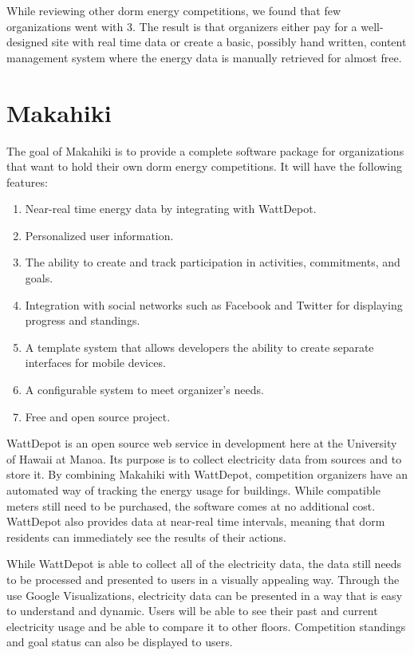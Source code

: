 While reviewing other dorm energy competitions, we found that few organizations went with 3.  The result is that organizers either pay for a well-designed site with real time data or create a basic, possibly hand written, content management system where the energy data is manually retrieved for almost free.

\section{Makahiki}

The goal of Makahiki is to provide a complete software package for organizations that want to hold their own dorm energy competitions.  It will have the following features:

\begin{enumerate}
	\item Near-real time energy data by integrating with WattDepot.
	\item Personalized user information.
	\item The ability to create and track participation in activities, commitments, and goals.
	\item Integration with social networks such as Facebook and Twitter for displaying progress and standings.
	\item A template system that allows developers the ability to create separate interfaces for mobile devices.
	\item A configurable system to meet organizer's needs.
	\item Free and open source project.
\end{enumerate}

WattDepot\cite{wattdepot} is an open source web service in development here at the University of Hawaii at Manoa.  Its purpose is to collect electricity data from sources and to store it.  By combining Makahiki with WattDepot, competition organizers have an automated way of tracking the energy usage for buildings.  While compatible meters still need to be purchased, the software comes at no additional cost.  WattDepot also provides data at near-real time intervals, meaning that dorm residents can immediately see the results of their actions.

While WattDepot is able to collect all of the electricity data, the data still needs to be processed and presented to users in a visually appealing way.  Through the use Google Visualizations, electricity data can be presented in a way that is easy to understand and dynamic.  Users will be able to see their past and current electricity usage and be able to compare it to other floors.  Competition standings and goal status can also be displayed to users.

